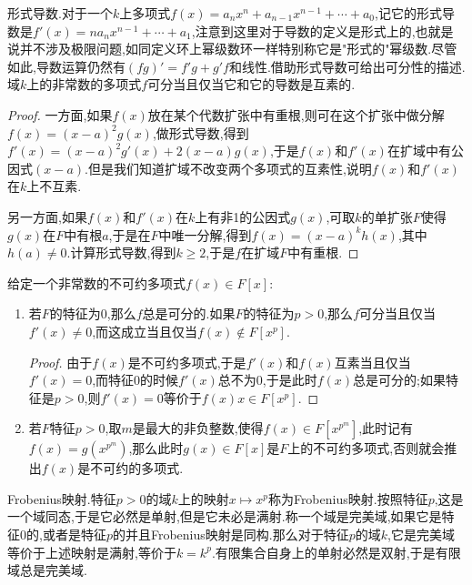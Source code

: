 形式导数.对于一个$k$上多项式$f(x)=a_nx^n+a_{n-1}x^{n-1}+\cdots+a_0$,记它的形式导数是$f'(x)=na_nx^{n-1}+\cdots+a_1$,注意到这里对于导数的定义是形式上的,也就是说并不涉及极限问题,如同定义环上幂级数环一样特别称它是"形式的"幂级数.尽管如此,导数运算仍然有$(fg)'=f'g+g'f$和线性.借助形式导数可给出可分性的描述.域$k$上的非常数的多项式$f$可分当且仅当它和它的导数是互素的.
\begin{proof}
	
	一方面,如果$f(x)$放在某个代数扩张中有重根,则可在这个扩张中做分解$f(x)=(x-a)^2g(x)$,做形式导数,得到$f'(x)=(x-a)^2g'(x)+2(x-a)g(x)$,于是$f(x)$和$f'(x)$在扩域中有公因式$(x-a)$.但是我们知道扩域不改变两个多项式的互素性,说明$f(x)$和$f'(x)$在$k$上不互素.
	
	另一方面,如果$f(x)$和$f'(x)$在$k$上有非1的公因式$g(x)$,可取$k$的单扩张$F$使得$g(x)$在$F$中有根$a$,于是在$F$中唯一分解,得到$f(x)=(x-a)^kh(x)$,其中$h(a)\not=0$.计算形式导数,得到$k\ge2$,于是$f$在扩域$F$中有重根.
\end{proof}

给定一个非常数的不可约多项式$f(x)\in F[x]$:
\begin{enumerate}
	\item 若$F$的特征为0,那么$f$总是可分的.如果$F$的特征为$p>0$,那么$f$可分当且仅当$f'(x)\not=0$,而这成立当且仅当$f(x)\not\in F[x^p]$.
	\begin{proof}
		
		由于$f(x)$是不可约多项式,于是$f'(x)$和$f(x)$互素当且仅当$f'(x)=0$,而特征0的时候$f'(x)$总不为0,于是此时$f(x)$总是可分的;如果特征是$p>0$,则$f'(x)=0$等价于$f(x)x\in F[x^p]$.
	\end{proof}
	\item 若$F$特征$p>0$,取$m$是最大的非负整数,使得$f(x)\in F[x^{p^m}]$,此时记有$f(x)=g(x^{p^m})$,那么此时$g(x)\in F[x]$是$F$上的不可约多项式,否则就会推出$f(x)$是不可约的多项式.
\end{enumerate}

Frobenius映射.特征$p>0$的域$k$上的映射$x\mapsto x^p$称为Frobenius映射.按照特征$p$,这是一个域同态,于是它必然是单射,但是它未必是满射.称一个域是完美域,如果它是特征0的,或者是特征$p$的并且Frobenius映射是同构.那么对于特征$p$的域$k$,它是完美域等价于上述映射是满射,等价于$k=k^p$.有限集合自身上的单射必然是双射,于是有限域总是完美域.

